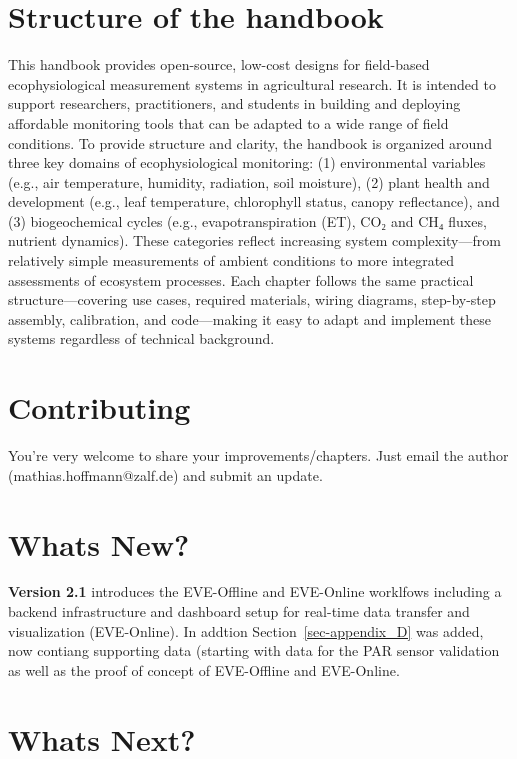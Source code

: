 \documentclass[
  11pt,
  letterpaper,
]{book}
\begin{document}
\section{Structure of the handbook}\label{sec-structure}

This handbook provides open-source, low-cost designs for field-based
ecophysiological measurement systems in agricultural research. It is
intended to support researchers, practitioners, and students in building
and deploying affordable monitoring tools that can be adapted to a wide
range of field conditions. To provide structure and clarity, the
handbook is organized around three key domains of ecophysiological
monitoring: (1) environmental variables (e.g., air temperature,
humidity, radiation, soil moisture), (2) plant health and development
(e.g., leaf temperature, chlorophyll status, canopy reflectance), and
(3) biogeochemical cycles (e.g., evapotranspiration (ET), CO₂ and CH₄
fluxes, nutrient dynamics). These categories reflect increasing system
complexity---from relatively simple measurements of ambient conditions
to more integrated assessments of ecosystem processes. Each chapter
follows the same practical structure---covering use cases, required
materials, wiring diagrams, step-by-step assembly, calibration, and
code---making it easy to adapt and implement these systems regardless of
technical background.

\section{Contributing}\label{sec-contributing}

You're very welcome to share your improvements/chapters. Just email the
author (mathias.hoffmann@zalf.de) and submit an update.

\section{Whats New?}\label{sec-whats-new}

\textbf{Version 2.1} introduces the EVE-Offline and EVE-Online worklfows
including a backend infrastructure and dashboard setup for real-time
data transfer and visualization (EVE-Online). In addtion
Section~\ref{sec-appendix_D} was added, now contiang supporting data
(starting with data for the PAR sensor validation as well as the proof
of concept of EVE-Offline and EVE-Online.

\section{Whats Next?}\label{sec-whats-next}
\end{document}
